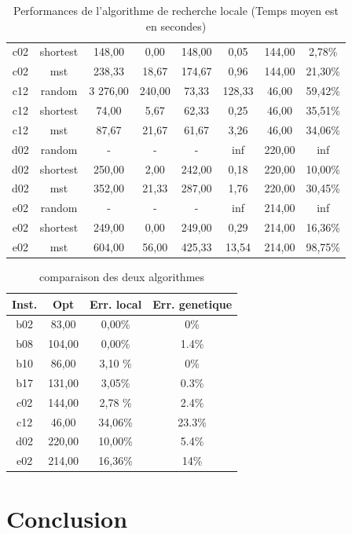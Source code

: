 \documentclass[10pt]{article}
\begin{document}
\begin{table}[h!]
\begin{tabular}{|c|c|c|c|c|c|c|c|}
\rowcolor{yellow!60} c02 & shortest & 148,00 & 0,00 & 148,00 & 0,05 & 144,00 & 2,78\% \\
c02 & mst & 238,33 & 18,67 & 174,67 & 0,96 & 144,00 & 21,30\% \\
\hline
c12 & random & 3 276,00 & 240,00 & 73,33 & 128,33 & 46,00 & 59,42\% \\
c12 & shortest & 74,00 & 5,67 & 62,33 & 0,25 & 46,00 & 35,51\% \\
\rowcolor{yellow!60} c12 & mst & 87,67 & 21,67 & 61,67 & 3,26 & 46,00 & 34,06\% \\
\hline
d02 & random & - & - & - & inf & 220,00 & inf \\
\rowcolor{yellow!60} d02 & shortest & 250,00 & 2,00 & 242,00 & 0,18 & 220,00 & 10,00\% \\
d02 & mst & 352,00 & 21,33 & 287,00 & 1,76 & 220,00 & 30,45\% \\
\hline
e02 & random & - & - & - & inf & 214,00 & inf \\
\rowcolor{yellow!60} e02 & shortest & 249,00 & 0,00 & 249,00 & 0,29 & 214,00 & 16,36\% \\
e02 & mst & 604,00 & 56,00 & 425,33 & 13,54 & 214,00 & 98,75\% \\
\hline
		\end{tabular}
		\caption{Performances de l'algorithme de recherche locale (Temps moyen est en secondes)}
		\label{tab-perfls}
	\end{table}
	
	
	\begin{table}[h!]
		\centering
		\begin{tabular}{|c|c|c|c|}
		\hline
\textbf{Inst.}& \textbf{Opt} & \textbf{Err. local} &  \textbf{Err. genetique} \\
\hline
b02 & 83,00 & 0,00\% & 0\% \\
b08 & 104,00 & 0,00\% & 1.4\% \\
b10 & 86,00 & 3,10 \% & 0\% \\
b17 & 131,00 & 3,05\% & 0.3\%\\
c02 & 144,00 & 2,78 \% & 2.4\%\\
c12 & 46,00 & 34,06\%& 23.3\% \\
d02 & 220,00 & 10,00\% & 5.4\%\\
e02 & 214,00 & 16,36\% & 14\%\\
\hline
		\end{tabular}
		\caption{comparaison des deux algorithmes}
		\label{tab-perfls}
	\end{table}



\section{Conclusion}



	
\end{document}
